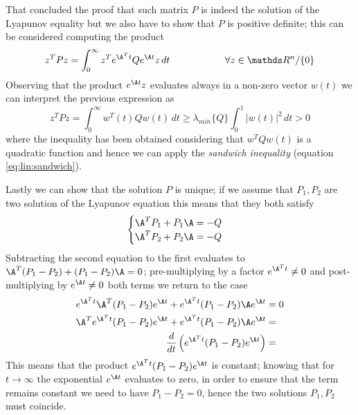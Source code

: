 		That concluded the proof that such matrix $P$ is indeed the solution of the Lyapunov equality but we also have to show that $P$ is positive definite; this can be considered computing the product
		\[ z^T P z = \int_0^\infty z^T e^{\A^T t} Q e^{\A t} z\, dt \hspace{2cm} \forall z\in \mathds R^{n}/\{0\}  \]
		Observing that the product $e^{\A t} z$ evaluates always in a non-zero vector $w(t)$ we can interpret the previous expression as
		\[ z^TPz = \int_0^\infty w^T(t) Q  w(t)\, dt \geq \lambda_{min}\{Q\} \int_0^1 |w(t)|^2 \, dt > 0 \]
		where the inequality has been obtained considering that $w^T Q w(t)$ is a quadratic function and hence we can apply the \textit{sandwich inequality} (equation \ref{eq:lin:sandwich}).
		
		Lastly we can show that the solution $P$ is unique; if we assume that $P_1,P_2$ are two solution of the Lyapunov equation this means that they both satisfy
		\[ \begin{cases}
			\A^T P_1 + P_1 \A = - Q \\ \A^T P_2 + P_2 \A = -Q
		\end{cases} \]
		Subtracting the second equation to the first evaluates to $\A^T(P_1-P_2) + (P_1-P_2) \A= 0$; pre-multiplying by a factor $e^{\A^T t} \neq 0$ and post-multiplying by $e^{\A t} \neq 0$ both terms we return to the case
		\begin{align*}
			e^{\A^T t} \A^T(P_1-P_2)e^{\A t} +	e^{\A^T t} (P_1-P_2) \A e^{\A t}  & = 0 \\
			\A^T e^{\A^T t} (P_1-P_2)e^{\A t} +	e^{\A^T t} (P_1-P_2) \A e^{\A t}  & = \\
			\frac{d}{dt} \left( e^{\A^T t} (P_1-P_2) e^{\A t} \right) & = 
		\end{align*}
		This means that the product $e^{\A^Tt}(P_1-P_2) e^{\A t}$ is constant; knowing that for $t\rightarrow \infty$ the exponential $e^{\A t}$ evaluates to zero, in order to ensure that the term remains constant we need to have $P_1 - P_2 = 0$, hence the two solutions $P_1,P_2$ must coincide.
		

